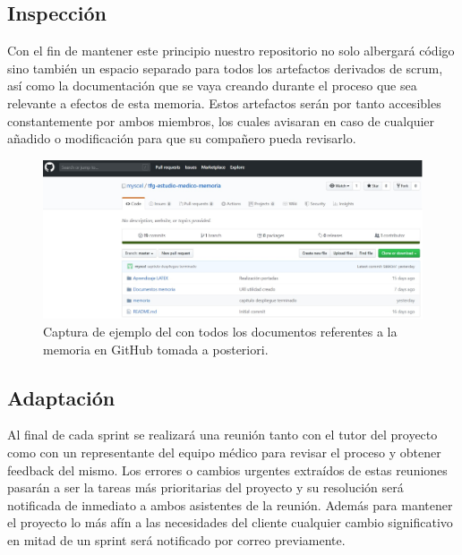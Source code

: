     \subsection{Inspección}
    Con el fin de mantener este principio nuestro repositorio no solo albergará código sino también un espacio separado para todos los artefactos derivados de scrum, así como la documentación que se vaya creando durante el proceso que sea relevante a efectos de esta memoria. Estos artefactos serán por tanto accesibles constantemente por ambos miembros, los cuales avisaran en caso de cualquier añadido o modificación para que su compañero pueda revisarlo.\newline
    
    \begin{figure}[h]
    \centering
     \includegraphics[width=1\textwidth]{images/GitHubMemoria.jpg}
    \caption{Captura de ejemplo del con todos los documentos referentes a la memoria en GitHub tomada a posteriori.}
    \end{figure}
    \newpage
    
     \subsection{Adaptación}
    Al final de cada sprint se realizará una reunión tanto con el tutor del proyecto como con un representante del equipo médico para revisar el proceso y obtener feedback del mismo. Los errores o cambios urgentes extraídos de estas reuniones pasarán a ser la tareas más prioritarias del proyecto y su resolución será notificada de inmediato a ambos asistentes de la reunión. Además para mantener el proyecto lo más afín a las necesidades del cliente cualquier cambio significativo en mitad de un sprint será notificado por correo previamente.
    \newline
    \newline
    \newline
    
